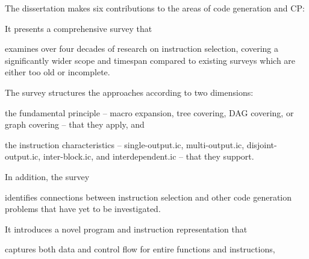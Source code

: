 The dissertation makes six contributions to the areas of \gls{code generation}
and \gls{CP}:
%
\begin{contributions}
  \item {}
    It presents a comprehensive survey that
    \begin{contributions}
      \item {}
        examines over four decades of research on \gls{instruction selection},
        covering a significantly wider scope and timespan compared to existing
        surveys \cite{Cattell:1977, GanapathiEtAl:1982:Survey, Lunell:1983,
          Leupers:2000:Survey, BoulytchevLomov:2001} which are either too old
        or incomplete.
    \end{contributions}
    The survey structures the approaches according to two dimensions:
    \begin{contributions}[resume]
      \item {}
        the fundamental \gls{principle} -- \gls{macro expansion}, \gls{tree
          covering}, \gls{DAG covering}, or \gls{graph covering} -- that they
        apply, and
    \end{contributions}
    \begin{contributions}[resume]
      \item {}
        the \glspl{instruction characteristic} -- \gls{single-output.ic},
        \gls{multi-output.ic}, \gls{disjoint-output.ic}, \gls{inter-block.ic},
        and \gls{interdependent.ic} -- that they support.
    \end{contributions}
    In addition, the survey
    \begin{contributions}[resume]
      \item {}
        identifies connections between \gls{instruction selection} and other
        \gls{code generation} problems that have yet to be investigated.
    \end{contributions}
  \item {}
    It introduces a novel \gls{program} and \gls{instruction} representation
    that
    \begin{contributions}
      \item {}
        captures both data and control flow for entire \glspl{function} and
        \glspl{instruction},

\end{contributions}
\end{contributions}
